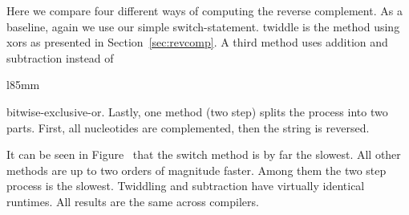 \documentclass[10pt,letterpaper]{article}
\begin{document}
Here we compare four different ways of computing the reverse complement. As a baseline, again we use our simple switch-statement. twiddle is the method using xors as presented in Section~\ref{sec:revcomp}. A third method uses addition and subtraction instead of

\begin{wrapfigure}{l}{85mm}
    \captionsetup{labelformat=empty} %
    \caption{}
    \label{fig:revcomp}
\end{wrapfigure}
\noindent bitwise-exclusive-or. Lastly, one method (two step) splits the process into two parts. First, all nucleotides are complemented, then the string is reversed.

It can be seen in Figure~{} that the switch method is by far the slowest. All other methods are up to two orders of magnitude faster. Among them the two step process is the slowest. Twiddling and subtraction have virtually identical runtimes. All results are the same across compilers.
\end{document}

